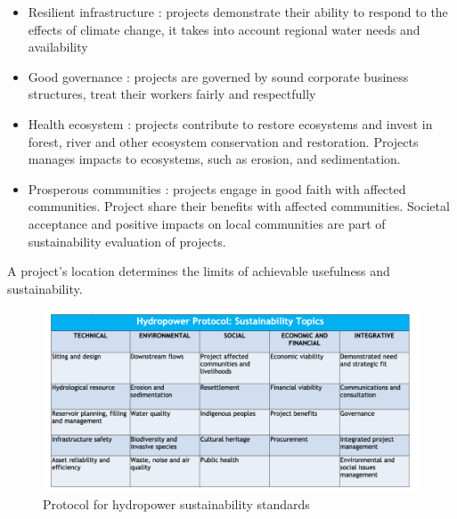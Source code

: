 \documentclass[../main.tex]{subfiles}
\begin{document}
\begin{itemize}
    \item Resilient infrastructure : projects demonstrate their ability to respond to the effects of climate change, it takes into account regional water needs and availability
    \item Good governance : projects are governed by sound corporate business structures, treat their workers fairly and respectfully
    \item Health ecosystem : projects contribute to restore ecosystems and invest in forest, river and other ecosystem conservation and restoration. Projects manages impacts to ecosystems, such as erosion, and sedimentation.
    \item Prosperous communities : projects engage in good faith with affected communities. Project share their benefits with affected communities. Societal acceptance and positive impacts on local communities are part of sustainability evaluation of projects.
\end{itemize}
\warning A project's location determines the limits of achievable usefulness and sustainability.\\

\begin{figure}[hbt!]
    \centering
    \includegraphics[width=0.7\linewidth]{IMAGES/Hydraulic/Screenshot from 2024-11-20 15-43-25.png}
    \caption{Protocol for hydropower sustainability standards}
\end{figure}
\end{document}
